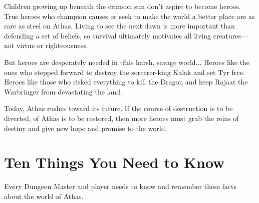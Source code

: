 Children growing up beneath the crimson sun don't aspire to become heroes. True heroes who champion causes or seek to make the world a better place are as rare as steel on Athas. Living to see the next dawn is more important than defending a set of beliefs, so survival ultimately motivates all living creatures---not virtue or righteousness.

But heroes are desperately needed in tfhis harsh, savage world... Heroes like the ones who stepped forward to destroy the sorcerer-king Kalak and set Tyr free. Heroes like those who risked everything to kill the Dragon and keep Rajaat the Warbringer from devastating the land.

Today, Athas rushes toward its future. If the course of destruction is to be diverted, of Athas is to be restored, then more heroes must grab the reins of destiny and give new hope and promise to the world.

\section{Ten Things You Need to Know}

Every Dungeon Master and player needs to know and remember these facts about the world of Athas.

